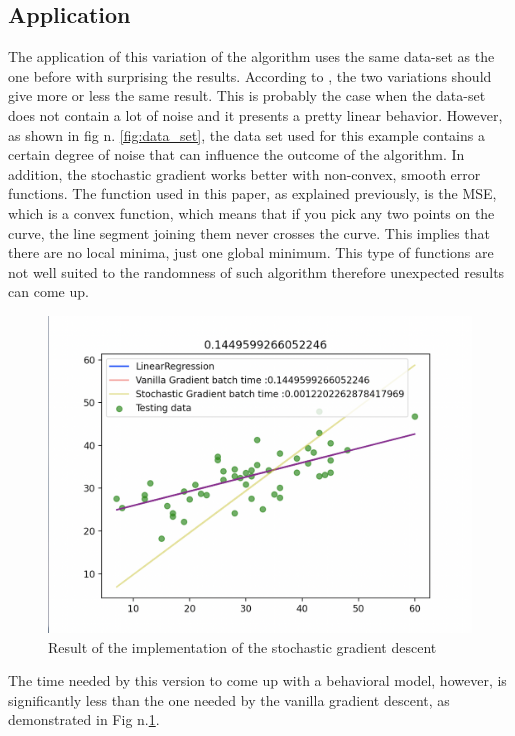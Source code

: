 \documentclass[conference]{IEEEtran}
\begin{document}
\subsection{Application}
The application of this variation of the algorithm uses the same data-set as the one before with surprising the results. 
According to  \cite{Scikit-Learn},  the two variations should give more or less the same result. This is probably the case when the data-set does not contain a lot of noise and it presents a pretty linear behavior. However, as shown in fig n. \ref{fig:data_set}, the data set used for this example contains a certain degree of noise that can influence the outcome of the algorithm. 
In addition, the stochastic gradient works better with non-convex, smooth error functions. The function used in this paper, as explained previously, is the MSE, which is a convex function, which means that if you pick any two points on the curve, the line segment joining them never crosses the curve. This implies that there are no local minima, just one global minimum. \cite{Scikit-Learn} This type of functions are not well suited to the randomness of such algorithm therefore unexpected results can come up. 
\begin{figure}[htbp]
    \includegraphics[scale=0.35]{Schermata 2021-05-01 alle 18.53.24.png}
    \caption{Result of the implementation of the stochastic gradient descent}
    \label{fig:stoc_res}
\end{figure}
The time needed by this version to come up with a behavioral model, however, is significantly less than the one needed by the vanilla gradient descent, as demonstrated in Fig n.\ref{fig:stoc_res}.
\end{document}
